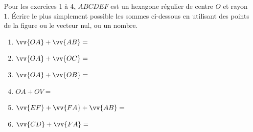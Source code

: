 \documentclass[main.tex]{subfiles}
\begin{document}
\noindent Pour les exercices 1 à 4,  $ABCDEF$ est un hexagone régulier de centre $O$ et rayon $1$. Écrire le plus simplement possible les sommes ci-dessous en utilisant des points de la figure ou le vecteur nul, ou un nombre.
\begin{exercise}\hfill 

\noindent
\parbox{0.40\linewidth}{\centering
{} 
}\hfill 
\parbox{0.55\linewidth}{
\begin{enumerate}[label=\alph*)]
\item\rule{0pt}{2.1em} $\vv{OA}+\vv{AB}=$
\item\rule{0pt}{2.1em} $\vv{OA}+\vv{OC}=$
\item\rule{0pt}{2.1em} $\vv{OA}+\vv{OB}=$
\item\rule{0pt}{2.1em} $OA+OV=$
\item\rule{0pt}{2.1em} $\vv{EF}+\vv{FA}+\vv{AB}=$
\item\rule{0pt}{2.1em} $\vv{CD}+\vv{FA}=$
\end{enumerate}
}
\end{exercise}
\vfill 
\end{document}
